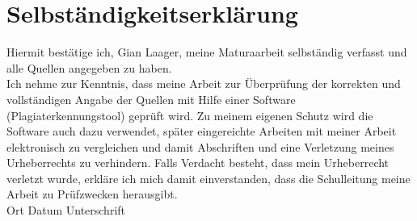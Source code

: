 \documentclass[11pt,DIV=10,final]{scrreprt} %
\begin{document}
\chapter*{Selbständigkeitserklärung}
%
Hiermit bestätige ich, Gian Laager, meine Maturaarbeit selbständig verfasst und alle Quellen angegeben zu haben.\\\newline
Ich nehme zur Kenntnis, dass meine Arbeit zur Überprüfung der korrekten und vollständigen Angabe der Quellen mit Hilfe einer Software (Plagiaterkennungstool) geprüft wird. Zu meinem eigenen Schutz wird die Software auch dazu verwendet, später eingereichte Arbeiten mit meiner Arbeit elektronisch zu vergleichen und damit Abschriften und eine Verletzung meines Urheberrechts zu verhindern. Falls Verdacht besteht, dass mein Urheberrecht verletzt wurde, erkläre ich mich damit einverstanden, dass die Schulleitung meine Arbeit zu Prüfzwecken herausgibt.\\\newline
Ort\hspace{4cm} Datum\hspace{4cm}  Unterschrift
%
\end{document}
